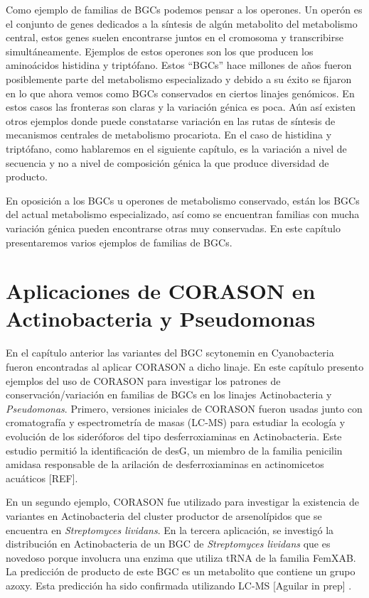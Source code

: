 \documentclass[12pt,twoside]{reedthesis}
\begin{document}
  Como ejemplo de familias de BGCs podemos pensar a los operones. Un
  operón es el conjunto de genes dedicados a la síntesis de algún
  metabolito del metabolismo central, estos genes suelen encontrarse
  juntos en el cromosoma y transcribirse simultáneamente. Ejemplos de
  estos operones son los que producen los aminoácidos histidina y
  triptófano. Estos ``BGCs'' hace millones de años fueron posiblemente
  parte del metabolismo especializado y debido a su éxito se fijaron en lo
  que ahora vemos como BGCs conservados en ciertos linajes genómicos. En
  estos casos las fronteras son claras y la variación génica es poca. Aún
  así existen otros ejemplos donde puede constatarse variación en las
  rutas de síntesis de mecanismos centrales de metabolismo procariota. En
  el caso de histidina y triptófano, como hablaremos en el siguiente
  capítulo, es la variación a nivel de secuencia y no a nivel de
  composición génica la que produce diversidad de producto.
  
  En oposición a los BGCs u operones de metabolismo conservado, están los
  BGCs del actual metabolismo especializado, así como se encuentran
  familias con mucha variación génica pueden encontrarse otras muy
  conservadas. En este capítulo presentaremos varios ejemplos de familias
  de BGCs.
  
  \section{Aplicaciones de CORASON en Actinobacteria y
  Pseudomonas}\label{aplicaciones-de-corason-en-actinobacteria-y-pseudomonas}
  
  En el capítulo anterior las variantes del BGC scytonemin en
  Cyanobacteria fueron encontradas al aplicar CORASON a dicho linaje. En
  este capítulo presento ejemplos del uso de CORASON para investigar los
  patrones de conservación/variación en familias de BGCs en los linajes
  Actinobacteria y \emph{Pseudomonas}. Primero, versiones iniciales de
  CORASON fueron usadas junto con cromatografía y espectrometría de masas
  (LC-MS) para estudiar la ecología y evolución de los sideróforos del
  tipo desferroxiaminas en Actinobacteria. Este estudio permitió la
  identificación de desG, un miembro de la familia penicilin amidasa
  responsable de la arilación de desferroxiaminas en actinomicetos
  acuáticos {[}REF{]}.
  
  En un segundo ejemplo, CORASON fue utilizado para investigar la
  existencia de variantes en Actinobacteria del cluster productor de
  arsenolípidos que se encuentra en \emph{Streptomyces lividans}. En la
  tercera aplicación, se investigó la distribución en Actinobacteria de un
  BGC de \emph{Streptomyces lividans} que es novedoso porque involucra una
  enzima que utiliza tRNA de la familia FemXAB. La predicción de producto
  de este BGC es un metabolito que contiene un grupo azoxy. Esta
  predicción ha sido confirmada utilizando LC-MS {[}Aguilar in prep{]} .
  
\end{document}

